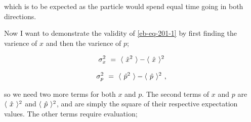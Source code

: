 \documentclass{article}
\begin{document}
which is to be expected as the particle would spend equal time going in both directions. 

Now I want to demonstrate the validity of \ref{eb-eq-201-1} by first finding the varience of \begin{math} x \end{math} and then the varience of \begin{math} p \end{math};

\begin{equation} \label{eb-eq-252-1}
\sigma_{x}^{2} \hspace{0.125cm} = \hspace{0.125cm} \langle \hspace{0.125cm} \hat{x}^{2} \hspace{0.125cm} \rangle - \langle \hspace{0.125cm} \hat{x} \hspace{0.125cm} \rangle^{2} 
\end{equation}

\begin{equation} \label{eb-eq-253-1}
\sigma_{p}^{2} \hspace{0.125cm} = \hspace{0.125cm} \langle \hspace{0.125cm} \hat{p}^{2} \hspace{0.125cm} \rangle - \langle \hspace{0.125cm} \hat{p} \hspace{0.125cm} \rangle^{2} \hspace{0.125cm} ,
\end{equation}

so we need two more terms for both \begin{math} x \end{math} and \begin{math} p \end{math}. The second terms of \begin{math} x \end{math} and \begin{math} p \end{math} are \begin{math} \langle \hspace{0.125cm} \hat{x} \hspace{0.125cm} \rangle^{2} \end{math} and \begin{math} \langle \hspace{0.125cm} \hat{p} \hspace{0.125cm} \rangle^{2} \end{math}, and are simply the square of their respective expectation values. The other terms require evaluation;
\end{document}
